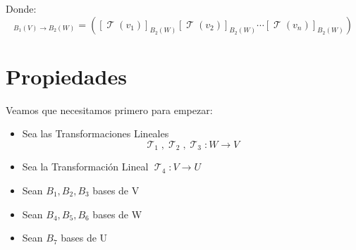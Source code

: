 \documentclass[12pt]{report}                                    %
\DeclareMathOperator \LinealTransformation {\mathcal{T}}        %
\begin{document}
        Donde:
        \begin{equation*}
            [\LinealTransformation]_{B_{1}(V) \to B_{2}(W)} = 
            \left(
                [\LinealTransformation(v_1)]_{B_{2}(W)}
                [\LinealTransformation(v_2)]_{B_{2}(W)}
                \cdots
                [\LinealTransformation(v_n)]_{B_{2}(W)}
            \right)
        \end{equation*}


        \clearpage
        \section{Propiedades}

            Veamos que necesitamos primero para empezar:
            
            \begin{itemize}
                \item Sea las Transformaciones Lineales 
                    \begin{equation*}
                        \LinealTransformation_1,
                        \LinealTransformation_2,
                        \LinealTransformation_3 : W \to V
                    \end{equation*}

                \item Sea la Transformación Lineal $\LinealTransformation_4: V \to U$
                
                \item Sean $B_1, B_2, B_3$ bases de V
                
                \item Sean $B_4, B_5, B_6$ bases de W
                
                \item Sean $B_7$ bases de U
            \end{itemize}
\end{document}
